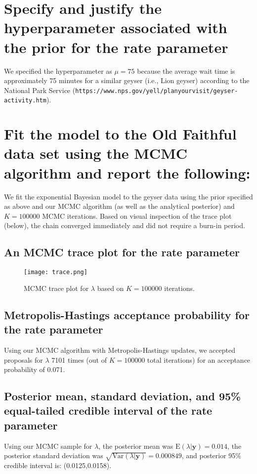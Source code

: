 \documentclass[12pt]{article} \topmargin=.1in \oddsidemargin=.25in
\begin{document}
\section{Specify and justify the hyperparameter associated with the prior for the rate parameter}
We specified the hyperparameter as $\mu=75$ because the average wait time is approximately 75 minutes for a similar geyser (i.e., Lion geyser) according to the National Park Service (\verb|https://www.nps.gov/yell/planyourvisit/geyser-activity.htm|).  

\section{Fit the model to the Old Faithful data set using the MCMC algorithm and report the following:}
We fit the exponential Bayesian model to the geyser data using the prior specified as above and our MCMC algorithm (as well as the analytical posterior) and $K=100000$ MCMC iterations.  Based on visual inspection of the trace plot (below), the chain converged immediately and did not require a burn-in period.   
\subsection{An MCMC trace plot for the rate parameter}
\begin{figure}[htp]
  \texttt{[image: trace.png]}  
  \caption{MCMC trace plot for $\lambda$ based on $K=100000$ iterations.}
  \label{fig:trace}
\end{figure}
\subsection{Metropolis-Hastings acceptance probability for the rate parameter}
Using our MCMC algorithm with Metropolis-Hastings updates, we accepted proposals for $\lambda$ 7101 times (out of $K=100000$ total iterations) for an acceptance probability of 0.071.  

\subsection{Posterior mean, standard deviation, and 95\% equal-tailed credible interval of the rate parameter}

Using our MCMC sample for $\lambda$, the posterior mean was $\text{E}(\lambda|\mathbf{y})=0.014$, the posterior standard deviation was $\sqrt{\text{Var}(\lambda|\mathbf{y})}=0.000849$, and posterior 95\% credible interval is: (0.0125,0.0158).
\end{document}
